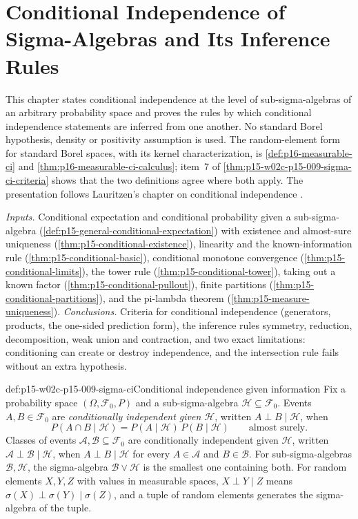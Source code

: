 \chapter{Conditional Independence of Sigma-Algebras and Its Inference Rules}
\label{sec:p15-w02c-p15-009-sigma-ci}

This chapter states conditional independence at the level of
sub-sigma-algebras of an arbitrary probability space and proves the rules
by which conditional independence statements are inferred from one another.
No standard Borel hypothesis, density or positivity assumption is used.
The random-element form for standard Borel spaces, with its kernel
characterization, is \cref{def:p16-measurable-ci} and
\cref{thm:p16-measurable-ci-calculus}; item~7 of
\cref{thm:p15-w02c-p15-009-sigma-ci-criteria} shows that the two
definitions agree where both apply. The presentation follows Lauritzen's
chapter on conditional independence \cite[ch.~2, pp.~39--52]{Lauritzen2019GraphicalLectures2020}.

\emph{Inputs.} Conditional expectation and conditional probability given a
sub-sigma-algebra (\cref{def:p15-general-conditional-expectation}) with
existence and almost-sure uniqueness (\cref{thm:p15-conditional-existence}),
linearity and the known-information rule (\cref{thm:p15-conditional-basic}),
conditional monotone convergence (\cref{thm:p15-conditional-limits}), the
tower rule (\cref{thm:p15-conditional-tower}), taking out a known factor
(\cref{thm:p15-conditional-pullout}), finite partitions
(\cref{thm:p15-conditional-partitions}), and the pi-lambda theorem
(\cref{thm:p15-measure-uniqueness}).
\emph{Conclusions.} Criteria for conditional independence (generators,
products, the one-sided prediction form), the inference rules symmetry,
reduction, decomposition, weak union and contraction, and two exact
limitations: conditioning can create or destroy independence, and the
intersection rule fails without an extra hypothesis.

\begin{hbdefinition}{def:p15-w02c-p15-009-sigma-ci}{Conditional independence given information}
Fix a probability space \((\Omega,\mathcal F_0,P)\) and a
sub-sigma-algebra \(\mathcal H\subseteq\mathcal F_0\). Events
\(A,B\in\mathcal F_0\) are \emph{conditionally independent given
\(\mathcal H\)}, written \(A\perp B\mid\mathcal H\), when
\[
 P(A\cap B\mid\mathcal H)=P(A\mid\mathcal H)\,P(B\mid\mathcal H)
 \qquad\text{almost surely.}
\]
Classes of events \(\mathcal A,\mathcal B\subseteq\mathcal F_0\) are
conditionally independent given \(\mathcal H\), written
\(\mathcal A\perp\mathcal B\mid\mathcal H\), when \(A\perp B\mid\mathcal H\)
for every \(A\in\mathcal A\) and \(B\in\mathcal B\). For sub-sigma-algebras
\(\mathcal B,\mathcal H\), the sigma-algebra \(\mathcal B\vee\mathcal H\) is
the smallest one containing both. For random elements \(X,Y,Z\) with values
in measurable spaces, \(X\perp Y\mid Z\) means
\(\sigma(X)\perp\sigma(Y)\mid\sigma(Z)\), and a tuple of random elements
generates the sigma-algebra of the tuple.
\end{hbdefinition}

